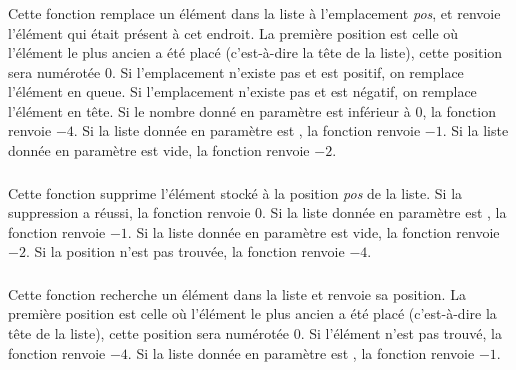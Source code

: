 \subsubsection*{}

\noindent Cette fonction remplace un élément dans la liste à l'emplacement \textit{pos}, et renvoie l'élément qui était présent à cet endroit.
La première position est celle où l'élément le plus ancien a été placé (c'est-à-dire la tête de la liste), cette position sera numérotée $ 0 $.
Si l'emplacement n'existe pas et est positif, on remplace l'élément en queue.
Si l'emplacement n'existe pas et est négatif, on remplace l'élément en tête.
Si le nombre donné en paramètre est inférieur à $ 0 $, la fonction renvoie $ -4 $.
Si la liste donnée en paramètre est , la fonction renvoie $ -1 $.
Si la liste donnée en paramètre est vide, la fonction renvoie $ -2 $.


\subsubsection*{}

\noindent Cette fonction supprime l'élément stocké à la position \textit{pos} de la liste. %
Si la suppression a réussi, la fonction renvoie $ 0 $. %
Si la liste donnée en paramètre est , la fonction renvoie $ -1 $. %
Si la liste donnée en paramètre est vide, la fonction renvoie $ -2 $. %
Si la position n'est pas trouvée, la fonction renvoie $ -4 $. %


\subsubsection*{}

\noindent Cette fonction recherche un élément dans la liste et renvoie sa position.
La première position est celle où l'élément le plus ancien a été placé (c'est-à-dire la tête de la liste), cette position sera numérotée $ 0 $.
Si l'élément n'est pas trouvé, la fonction renvoie $ -4 $.
Si la liste donnée en paramètre est , la fonction renvoie $ -1 $.


\subsubsection*{}

